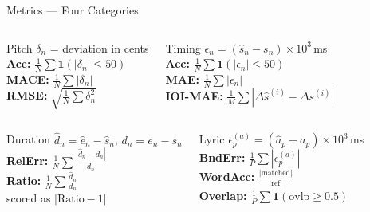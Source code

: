 \documentclass[aspectratio=169,9pt]{beamer}
\newcommand{\sh}{\hat{s}}
\newcommand{\eh}{\hat{e}}
\newcommand{\ah}{\hat{a}}
\newcommand{\dh}{\hat{d}}
\begin{document}
\begin{frame}{Metrics --- Four Categories}
  \begin{columns}[T]
      \begin{block}{Pitch}
        \footnotesize
        $\delta_n$ = deviation in cents\\[4pt]
        \textbf{Acc:}\;
        $\frac{1}{N}\sum\mathbf{1}(|\delta_n|\le50)$\\[4pt]
        \textbf{MACE:}\;
        $\frac{1}{N}\sum|\delta_n|$\\[4pt]
        \textbf{RMSE:}\;
        $\sqrt{\frac{1}{N}\sum\delta_n^2}$
      \end{block}


      \begin{block}{Timing}
        \footnotesize
        $\epsilon_n = (\sh_n-s_n)\times10^3$\,ms\\[4pt]
        \textbf{Acc:}\;
        $\frac{1}{N}\sum\mathbf{1}(|\epsilon_n|\le50)$\\[4pt]
        \textbf{MAE:}\;
        $\frac{1}{N}\sum|\epsilon_n|$\\[4pt]
        \textbf{IOI-MAE:}\;
        $\frac{1}{M}\sum|\Delta\sh^{(i)}-\Delta s^{(i)}|$
      \end{block}
  \end{columns}

  \vspace{0.04\textheight}

  \begin{columns}[T]
      \begin{block}{Duration}
        \footnotesize
        $\dh_n = \eh_n-\sh_n$,\; $d_n=e_n-s_n$\\[4pt]
        \textbf{RelErr:}\;
        $\frac{1}{N}\sum\frac{|\dh_n-d_n|}{d_n}$\\[4pt]
        \textbf{Ratio:}\;
        $\frac{1}{N}\sum\frac{\dh_n}{d_n}$\\[4pt]
        \small scored as $|\mathrm{Ratio}-1|$
      \end{block}


      \begin{block}{Lyric}
        \footnotesize
        $\epsilon_p^{(a)} = (\ah_p-a_p)\times10^3$\,ms\\[4pt]
        \textbf{BndErr:}\;
        $\frac{1}{P}\sum|\epsilon_p^{(a)}|$\\[4pt]
        \textbf{WordAcc:}\;
        $\frac{|\text{matched}|}{|\text{ref}|}$\\[4pt]
        \textbf{Overlap:}\;
        $\frac{1}{P}\sum\mathbf{1}(\mathrm{ovlp}\ge0.5)$
      \end{block}
  \end{columns}
\end{frame}
\end{document}
